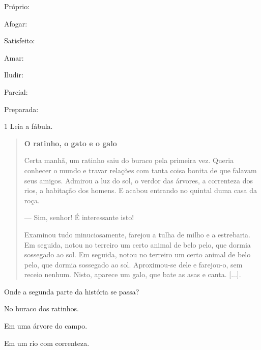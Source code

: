 \begin{boxlist}
\begin{escolha}
\item Próprio: 

\item Afogar: 

\item Satisfeito: 

\item Amar: 

\item Iludir: 

\item Parcial: 

\item Preparada: 
\end{escolha}


\num{1} Leia a fábula.

\begin{quote}
\textbf{O ratinho, o gato e o galo}

Certa manhã, um ratinho saiu do buraco pela primeira vez. Queria
conhecer o mundo e travar relações com tanta coisa bonita de que falavam
seus amigos. Admirou a luz do sol, o verdor das árvores, a correnteza
dos rios, a habitação dos homens. E acabou entrando no quintal duma casa
da roça.

--- Sim, senhor! É interessante isto!

Examinou tudo minuciosamente, farejou a tulha de milho e a estrebaria.
Em seguida, notou no terreiro um certo animal de belo pelo, que dormia
sossegado ao sol. Em seguida, notou no terreiro um certo animal de belo
pelo, que dormia sossegado ao sol. Aproximou-se dele e farejou-o, sem
receio nenhum. Nisto, aparece um galo, que bate as asas e canta.
{[}...{]}.

\end{quote}

Onde a segunda parte da história se passa?

\begin{escolha}
\item No buraco dos ratinhos.

\item Em uma árvore do campo.

\item Em um rio com correnteza.


\end{escolha}
\end{boxlist}

